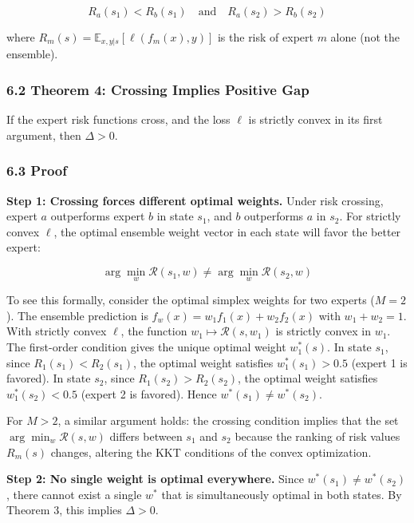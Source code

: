 \documentclass[
  12pt,
]{article}
\begin{document}
\[R_a(s_1) < R_b(s_1) \quad \text{and} \quad R_a(s_2) > R_b(s_2)\]

where \(R_m(s) = \mathbb{E}_{x,y|s}[\ell(f_m(x), y)]\) is the risk of
expert \(m\) alone (not the ensemble).

\subsubsection{6.2 Theorem 4: Crossing Implies Positive
Gap}\label{theorem-4-crossing-implies-positive-gap}

If the expert risk functions cross, and the loss \(\ell\) is strictly
convex in its first argument, then \(\Delta > 0\).

\subsubsection{6.3 Proof}\label{proof-2}

\textbf{Step 1: Crossing forces different optimal weights.} Under risk
crossing, expert \(a\) outperforms expert \(b\) in state \(s_1\), and
\(b\) outperforms \(a\) in \(s_2\). For strictly convex \(\ell\), the
optimal ensemble weight vector in each state will favor the better
expert:

\[\arg\min_w \mathcal{R}(s_1, w) \neq \arg\min_w \mathcal{R}(s_2, w)\]

To see this formally, consider the optimal simplex weights for two
experts (\(M=2\)). The ensemble prediction is
\(f_w(x) = w_1 f_1(x) + w_2 f_2(x)\) with \(w_1 + w_2 = 1\). With
strictly convex \(\ell\), the function
\(w_1 \mapsto \mathcal{R}(s, w_1)\) is strictly convex in \(w_1\). The
first-order condition gives the unique optimal weight \(w_1^*(s)\). In
state \(s_1\), since \(R_1(s_1) < R_2(s_1)\), the optimal weight
satisfies \(w_1^*(s_1) > 0.5\) (expert 1 is favored). In state \(s_2\),
since \(R_1(s_2) > R_2(s_2)\), the optimal weight satisfies
\(w_1^*(s_2) < 0.5\) (expert 2 is favored). Hence
\(w^*(s_1) \neq w^*(s_2)\).

For \(M > 2\), a similar argument holds: the crossing condition implies
that the set \(\arg\min_w \mathcal{R}(s, w)\) differs between \(s_1\)
and \(s_2\) because the ranking of risk values \(R_m(s)\) changes,
altering the KKT conditions of the convex optimization.

\textbf{Step 2: No single weight is optimal everywhere.} Since
\(w^*(s_1) \neq w^*(s_2)\), there cannot exist a single \(w^*\) that is
simultaneously optimal in both states. By Theorem 3, this implies
\(\Delta > 0\).
\end{document}
